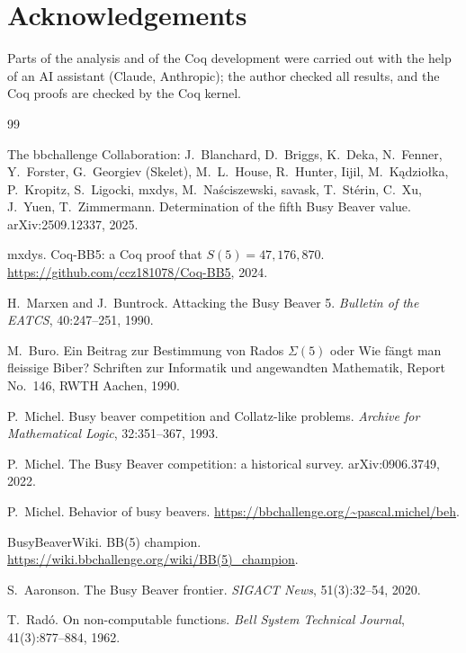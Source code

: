 \documentclass[11pt]{article}
\theoremstyle{definition}
\theoremstyle{remark}
\begin{document}
\section*{Acknowledgements}
Parts of the analysis and of
the Coq development were carried out with the help of an AI assistant (Claude,
Anthropic); the author checked all results, and the Coq proofs are checked by the Coq
kernel.

\begin{thebibliography}{99}

The bbchallenge Collaboration: J.~Blanchard, D.~Briggs, K.~Deka, N.~Fenner,
Y.~Forster, G.~Georgiev (Skelet), M.~L.~House, R.~Hunter, Iijil, M.~K\k{a}dzio\l{}ka,
P.~Kropitz, S.~Ligocki, mxdys, M.~Na\'sciszewski, savask, T.~St\'erin, C.~Xu, J.~Yuen,
T.~Zimmermann.
\newblock Determination of the fifth Busy Beaver value.
\newblock arXiv:2509.12337, 2025.

mxdys.
\newblock Coq-BB5: a Coq proof that $S(5) = 47{,}176{,}870$.
\newblock \url{https://github.com/ccz181078/Coq-BB5}, 2024.

H.~Marxen and J.~Buntrock.
\newblock Attacking the Busy Beaver 5.
\newblock \emph{Bulletin of the EATCS}, 40:247--251, 1990.

M.~Buro.
\newblock Ein Beitrag zur Bestimmung von Rados $\Sigma(5)$ oder Wie f\"angt man fleissige Biber?
\newblock Schriften zur Informatik und angewandten Mathematik, Report No.~146, RWTH Aachen, 1990.

P.~Michel.
\newblock Busy beaver competition and Collatz-like problems.
\newblock \emph{Archive for Mathematical Logic}, 32:351--367, 1993.

P.~Michel.
\newblock The Busy Beaver competition: a historical survey.
\newblock arXiv:0906.3749, 2022.

P.~Michel.
\newblock Behavior of busy beavers.
\newblock \url{https://bbchallenge.org/~pascal.michel/beh}.

BusyBeaverWiki.
\newblock BB(5) champion.
\newblock \url{https://wiki.bbchallenge.org/wiki/BB(5)_champion}.

S.~Aaronson.
\newblock The Busy Beaver frontier.
\newblock \emph{SIGACT News}, 51(3):32--54, 2020.

T.~Rad\'o.
\newblock On non-computable functions.
\newblock \emph{Bell System Technical Journal}, 41(3):877--884, 1962.

\end{thebibliography}
\end{document}
